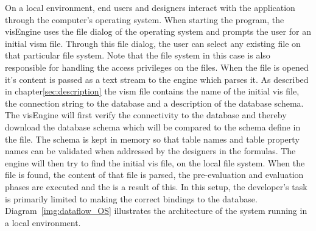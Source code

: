 On a local environment, end users and designers interact with the application through the computer's operating system. When starting the program, the visEngine uses the file dialog of the operating system and prompts the user for an initial vism file. Through this file dialog, the user can select any existing file on that particular file system. Note that the file system in this case is also responsible for handling the access privileges on the files. When the file is opened it's content is passed as a text stream to the engine which parses it. As described in chapter\ref{sec:description} the vism file contains the name of the initial vis file, the connection string to the database and a description of the database schema. The visEngine will first verify the connectivity to the database and thereby download the database schema which will be compared to the schema define in the file. The schema is kept in memory so that table names and table property names can be validated when addressed by the designers in the formulas. The engine will then try to find the initial vis file, on the local file system. When the file is found, the content of that file is parsed, the pre-evaluation and evaluation phases are executed and the is a result of this. In this setup, the developer's task is primarily limited to making the correct bindings to the database. Diagram~\ref{img:dataflow_OS} illustrates the architecture of the system running in a local environment.

